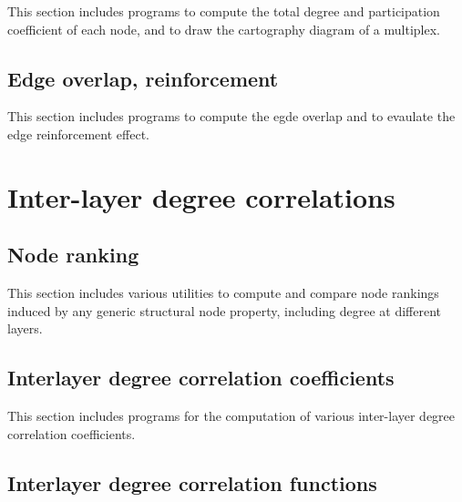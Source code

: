 \documentclass[a4paper,11pt]{book}
\begin{document}
This section includes programs to compute the total degree and
participation coefficient of each node, and to draw the cartography
diagram of a multiplex.





\clearpage

\subsection{Edge overlap, reinforcement}
This section includes programs to compute the egde overlap and to
evaulate the edge reinforcement effect. 




\clearpage

\section{Inter-layer degree correlations}

\subsection{Node ranking}

This section includes various utilities to compute and compare node
rankings induced by any generic structural node property, including
degree at different layers.




\clearpage

\subsection{Interlayer degree correlation coefficients}

This section includes programs for the computation of various
inter-layer degree correlation coefficients.




\clearpage


\subsection{Interlayer degree correlation functions}
\end{document}
